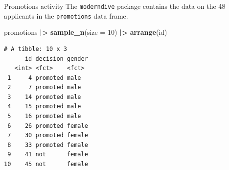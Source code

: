 \documentclass[
  ignorenonframetext,
]{beamer}
\newenvironment{Shaded}{\begin{snugshade}}{\end{snugshade}}
\newcommand{\AttributeTok}[1]{\textcolor[rgb]{0.13,0.29,0.53}{#1}}
\newcommand{\DecValTok}[1]{\textcolor[rgb]{0.00,0.00,0.81}{#1}}
\newcommand{\FunctionTok}[1]{\textcolor[rgb]{0.13,0.29,0.53}{\textbf{#1}}}
\newcommand{\NormalTok}[1]{#1}
\newcommand{\SpecialCharTok}[1]{\textcolor[rgb]{0.81,0.36,0.00}{\textbf{#1}}}
\begin{document}
\begin{frame}[fragile]{Promotions activity}
\protect\hypertarget{promotions-activity-2}{}
The \texttt{moderndive} package contains the data on the 48 applicants
in the \texttt{promotions} data frame.

\tiny

\begin{Shaded}
\begin{Highlighting}[]
\NormalTok{promotions }\SpecialCharTok{|\textgreater{}} 
  \FunctionTok{sample\_n}\NormalTok{(}\AttributeTok{size =} \DecValTok{10}\NormalTok{) }\SpecialCharTok{|\textgreater{}} 
  \FunctionTok{arrange}\NormalTok{(id)}
\end{Highlighting}
\end{Shaded}

\begin{verbatim}
# A tibble: 10 x 3
      id decision gender
   <int> <fct>    <fct> 
 1     4 promoted male  
 2     7 promoted male  
 3    14 promoted male  
 4    15 promoted male  
 5    16 promoted male  
 6    26 promoted female
 7    30 promoted female
 8    33 promoted female
 9    41 not      female
10    45 not      female
\end{verbatim}

\normalsize
\end{frame}
\end{document}
